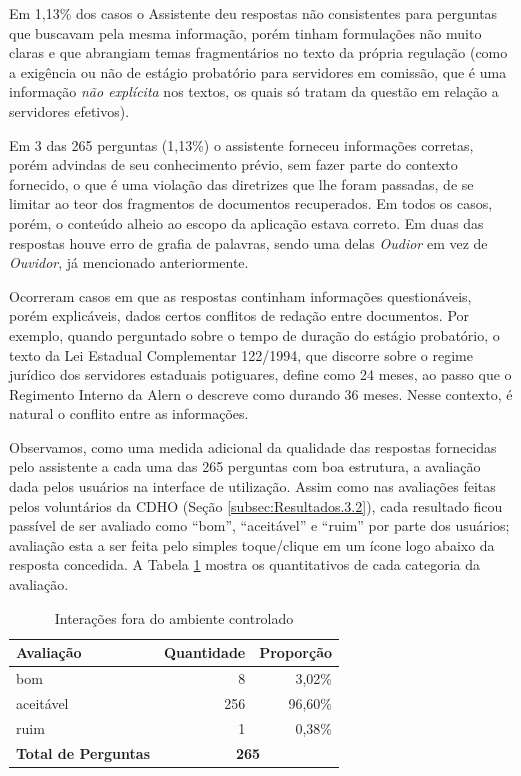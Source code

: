Em 1,13\% dos casos o Assistente deu respostas não consistentes para perguntas que buscavam pela mesma informação, porém tinham formulações não muito claras e que abrangiam temas fragmentários no texto da própria regulação (como a exigência ou não de estágio probatório para servidores em comissão, que é uma informação \textit{não explícita} nos textos, os quais só tratam da questão em relação a servidores efetivos).

Em 3 das 265 perguntas (1,13\%) o assistente forneceu informações corretas, porém advindas de seu conhecimento prévio, sem fazer parte do contexto fornecido, o que é uma violação das diretrizes que lhe foram passadas, de se limitar ao teor dos fragmentos de documentos recuperados. Em todos os casos, porém, o conteúdo alheio ao escopo da aplicação estava correto. Em duas das respostas houve erro de grafia de palavras, sendo uma delas \textit{Oudior} em vez de \textit{Ouvidor}, já mencionado anteriormente.

Ocorreram casos em que as respostas continham informações questionáveis, porém explicáveis, dados certos conflitos de redação entre documentos. Por exemplo, quando perguntado sobre o tempo de duração do estágio probatório, o texto da Lei Estadual Complementar 122/1994, que discorre sobre o regime jurídico dos servidores estaduais potiguares, define como 24 meses, ao passo que o Regimento Interno da Alern o descreve como durando 36 meses. Nesse contexto, é natural o conflito entre as informações.

Observamos, como uma medida adicional da qualidade das respostas fornecidas pelo assistente a cada uma das 265 perguntas com boa estrutura, a avaliação dada pelos usuários na interface de utilização. Assim como nas avaliações feitas pelos voluntários da \ac{CDHO} (Seção \ref{subsec:Resultados.3.2}), cada resultado ficou passível de ser avaliado como ``bom'', ``aceitável'' e ``ruim'' por parte dos usuários; avaliação esta a ser feita pelo simples toque/clique em um ícone logo abaixo da resposta concedida. A Tabela \ref{tab:testes-interacoes-avaliacoes-usuarios} mostra os quantitativos de cada categoria da avaliação.

\begin{table}[H]
    \centering
    \begin{tabular}{l r r}
        \hline
        \textbf{Avaliação} &\textbf{Quantidade} & \textbf{Proporção} \\
        \hline
        bom & 8 & 3,02\% \\
        aceitável & 256 & 96,60\% \\
        ruim & 1 & 0,38\% \\
        \hline
        \textbf{Total de Perguntas} & \multicolumn{2}{c}{\textbf{265}} \\
        \hline
    \end{tabular}
    \caption{Interações fora do ambiente controlado}
    \label{tab:testes-interacoes-avaliacoes-usuarios}
\end{table}

